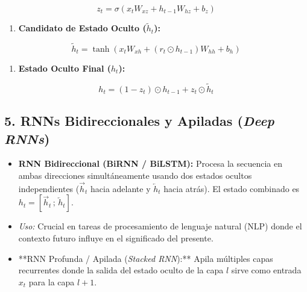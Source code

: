 \documentclass[11pt,oneside]{article}
\begin{document}
\[z_t = \sigma\left(x_t W_{xz} + h_{t-1} W_{hz} + b_z\right)\]

\begin{enumerate}

\item \textbf{Candidato de Estado Oculto (\(\tilde{h}_t\)):}

\end{enumerate}

\[\tilde{h}_t = \tanh\left(x_t W_{xh} + (r_t \odot h_{t-1}) W_{hh} + b_h\right)\]

\begin{enumerate}

\item \textbf{Estado Oculto Final (\(h_t\)):}

\end{enumerate}

\[h_t = (1 - z_t) \odot h_{t-1} + z_t \odot \tilde{h}_t\]

\subsection{5. RNNs Bidireccionales y Apiladas (\emph{Deep RNNs})}

\begin{itemize}

\item \textbf{RNN Bidireccional (BiRNN / BiLSTM):} Procesa la secuencia en ambas direcciones simultáneamente usando dos estados ocultos independientes (\(\overrightarrow{h}_t\) hacia adelante y \(\overleftarrow{h}_t\) hacia atrás). El estado combinado es \(h_t = [\overrightarrow{h}_t \,;\, \overleftarrow{h}_t]\).

\end{itemize}

\begin{itemize}

\item \emph{Uso:} Crucial en tareas de procesamiento de lenguaje natural (NLP) donde el contexto futuro influye en el significado del presente.

\end{itemize}

\begin{itemize}

\item **RNN Profunda / Apilada (\emph{Stacked RNN}):** Apila múltiples capas recurrentes donde la salida del estado oculto de la capa \(l\) sirve como entrada \(x_t\) para la capa \(l+1\).

\end{itemize}
\end{document}
